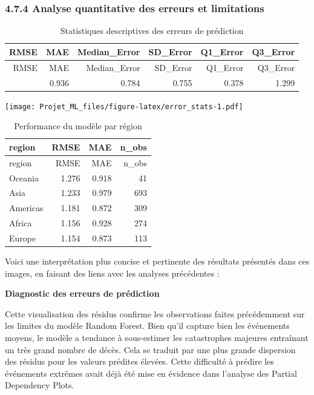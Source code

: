 \documentclass[
]{article}
\begin{document}
\subsubsection{4.7.4 Analyse quantitative des erreurs et
limitations}\label{analyse-quantitative-des-erreurs-et-limitations}

\begin{longtable}[]{@{}rrrrrr@{}}
\caption{Statistiques descriptives des erreurs de
prédiction}\tabularnewline
\toprule\noalign{}
RMSE & MAE & Median\_Error & SD\_Error & Q1\_Error & Q3\_Error \\
\midrule\noalign{}
\endfirsthead
\toprule\noalign{}
RMSE & MAE & Median\_Error & SD\_Error & Q1\_Error & Q3\_Error \\
\midrule\noalign{}
\endhead
\bottomrule\noalign{}
\endlastfoot
1.202 & 0.936 & 0.784 & 0.755 & 0.378 & 1.299 \\
\end{longtable}

\texttt{[image: Projet\_ML\_files/figure-latex/error\_stats-1.pdf]}

\begin{longtable}[]{@{}lrrr@{}}
\caption{Performance du modèle par région}\tabularnewline
\toprule\noalign{}
region & RMSE & MAE & n\_obs \\
\midrule\noalign{}
\endfirsthead
\toprule\noalign{}
region & RMSE & MAE & n\_obs \\
\midrule\noalign{}
\endhead
\bottomrule\noalign{}
\endlastfoot
Oceania & 1.276 & 0.918 & 41 \\
Asia & 1.233 & 0.979 & 693 \\
Americas & 1.181 & 0.872 & 309 \\
Africa & 1.156 & 0.928 & 274 \\
Europe & 1.154 & 0.873 & 113 \\
\end{longtable}

Voici une interprétation plus concise et pertinente des résultats
présentés dans ces images, en faisant des liens avec les analyses
précédentes :

\textbf{Diagnostic des erreurs de prédiction}

Cette visualisation des résidus confirme les observations faites
précédemment sur les limites du modèle Random Forest. Bien qu'il capture
bien les événements moyens, le modèle a tendance à sous-estimer les
catastrophes majeures entraînant un très grand nombre de décès. Cela se
traduit par une plus grande dispersion des résidus pour les valeurs
prédites élevées. Cette difficulté à prédire les événements extrêmes
avait déjà été mise en évidence dans l'analyse des Partial Dependency
Plots.
\end{document}
